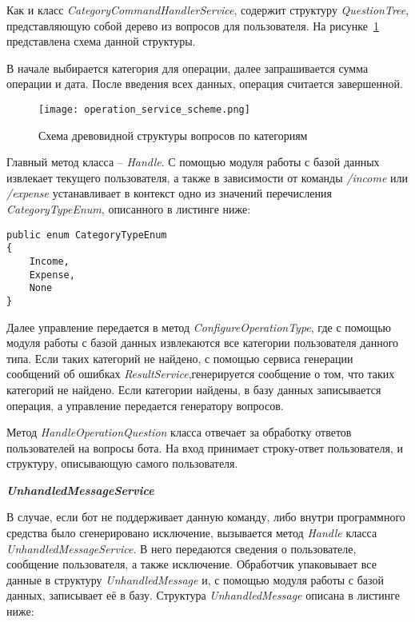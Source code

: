 Как и класс \emph{CategoryCommandHandlerService}, содержит структуру
\linebreak \emph{QuestionTree}, представляющую собой дерево из вопросов для пользователя. На рисунке~\ref{fig:design:server:operation_service_scheme} представлена схема данной структуры.

В начале выбирается категория для операции, далее запрашивается
сумма операции и дата. После введения всех данных, операция считается завершенной.

\begin{figure}[!h]
\centering
	\texttt{[image: operation\_service\_scheme.png]}
	\caption{Схема древовидной структуры вопросов по категориям}
	\label{fig:design:server:operation_service_scheme}
\end{figure}

Главный метод класса – \emph{Handle}. С помощью модуля работы с базой
данных извлекает текущего пользователя, а также в зависимости от команды \emph{/income} или \emph{/expense} устанавливает в контекст одно из значений перечисления \emph{CategoryTypeEnum}, описанного в листинге ниже:

\lstset{style=sharpc}
\begin{lstlisting}
public enum CategoryTypeEnum
{
	Income,
	Expense,
	None
}
\end{lstlisting}

Далее управление передается в метод \emph{ConfigureOperationType}, где с помощью модуля работы с базой данных извлекаются все категории
пользователя данного типа. Если таких категорий не найдено, с помощью сервиса генерации сообщений об ошибках \emph{ResultService},генерируется сообщение о том, что таких категорий не найдено. Если категории найдены, в базу данных записывается операция, а управление передается генератору вопросов.

Метод \emph{HandleOperationQuestion} класса отвечает за обработку ответов пользователей на вопросы бота. На вход принимает строку-ответ пользователя, и структуру, описывающую самого пользователя.

\textbf{\emph{UnhandledMessageService}}

В случае, если бот не поддерживает данную команду, либо внутри программного средства было сгенерировано исключение, вызывается метод \emph{Handle} класса \emph{UnhandledMessageService}. В него передаются сведения о пользователе, сообщение пользователя, а также исключение. Обработчик упаковывает все данные в структуру \emph{UnhandledMessage} и, с помощью модуля работы с базой данных, записывает её в базу. Структура \emph{UnhandledMessage} описана в листинге ниже:

